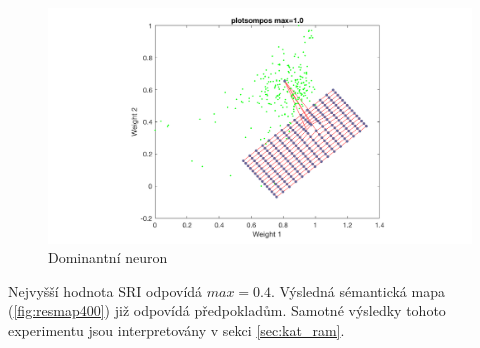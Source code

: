 \documentclass[thesis=M,czech]{FITthesis}[2012/06/26]
\begin{document}
\begin{figure}[htbp]
\begin{center}
	\includegraphics[scale=0.2]{plotsompos1000.png}
\caption{Dominantní neuron}
\label{fig:plotsompos1000}
\end{center}
\end{figure}


Nejvyšší hodnota SRI odpovídá $max=0.4$. Výsledná sémantická mapa (\ref{fig:resmap400}) již odpovídá předpokladům. Samotné výsledky tohoto experimentu jsou interpretovány v sekci \ref{sec:kat_ram}.
\end{document}
